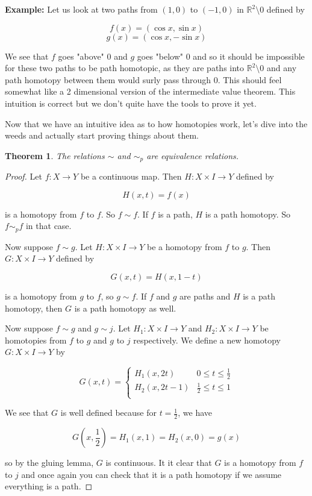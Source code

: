 \documentclass[a4paper]{article}
\newtheorem{theorem}{Theorem}
\numberwithin{theorem}{section}
\begin{document}
\textbf{Example:} Let us look at two paths from $(1,0)$ to $(-1,0)$ in $\mathbb{R}^2 \setminus 0$ defined by

$$ f(x) = (\cos x, \sin x) $$
$$ g(x) = (\cos x, -\sin x) $$

We see that $f$ goes "above" 0 and $g$ goes "below" 0 and so it should be impossible for these two paths to be path homotopic, as they are paths into $\mathbb{R}^2 \setminus 0$ and any path homotopy between them would surly pass through 0. This should feel somewhat like a 2 dimensional version of the intermediate value theorem. This intuition is correct but we don't quite have the tools to prove it yet.

Now that we have an intuitive idea as to how homotopies work, let's dive into the weeds and actually start proving things about them.

\begin{theorem}
The relations $\sim$ and $\sim_p$ are equivalence relations.
\end{theorem}

\begin{proof}
Let $f: X \rightarrow Y$ be a continuous map. Then $H: X \times I \rightarrow Y$ defined by

$$ H(x,t) = f(x) $$

is a homotopy from $f$ to $f$. So $f \sim f$. If $f$ is a path, $H$ is a path homotopy. So $f \sim_p f$ in that case.

Now suppose $f \sim g$. Let $H: X \times I \rightarrow Y$ be a homotopy from $f$ to $g$. Then $G: X \times I \rightarrow Y$ defined by 

$$ G(x,t) = H(x,1-t) $$

is a homotopy from $g$ to $f$, so $g \sim f$. If $f$ and $g$ are paths and $H$ is a path homotopy, then $G$ is a path homotopy as well.

Now suppose $f \sim g$ and $g \sim j$. Let $H_1: X \times I \rightarrow Y$ and $H_2: X \times I \rightarrow Y$ be homotopies from $f$ to $g$ and $g$ to $j$ respectively. We define a new homotopy $G: X \times I \rightarrow Y$ by

\[ G(x,t) =  \left\{
\begin{array}{ll}
      H_1(x,2t) & 0 \leq t \leq \frac{1}{2} \\
      H_2(x,2t-1) & \frac{1}{2} \leq t \leq 1 \\
\end{array} 
\right. \]

We see that $G$ is well defined because for $t = \frac{1}{2}$, we have

$$ G\left(x,\frac{1}{2}\right) = H_1(x,1) = H_2(x,0) = g(x) $$

so by the gluing lemma, $G$ is continuous. It it clear that $G$ is a homotopy from $f$ to $j$ and once again you can check that it is a path homotopy if we assume everything is a path.
\end{proof}
\end{document}
